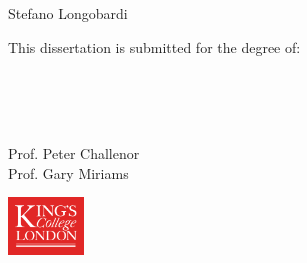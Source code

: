 \begin{titlepage}
    \begin{center}
        \large
        
        \vfill
        
        \hfill
        
        \begingroup
            \color{CTtitle}\spacedallcaps{\myTitle} \\ \bigskip
        \endgroup
        
        \vfill
        
         \\ \medskip
        Stefano Longobardi
        
        \vfill
        
        This dissertation is submitted for the degree of: \\ \medskip
        \textit{\myDegree}
        
        \vfill
        
        \begin{minipage}[t]{0.1\textwidth}
        \end{minipage}
        \hfill
        \begin{minipage}[t]{0.4\textwidth}\raggedright
         \\ \medskip
        \myProf \\
        \myOtherProf
        \end{minipage}
        \hfill
        \begin{minipage}[t]{0.4\textwidth}\raggedleft
         \\ \medskip
        Prof. Peter Challenor \\
        Prof. Gary Miriams
        \end{minipage}
        \hfill
        \begin{minipage}[t]{0.1\textwidth}
        \end{minipage}
        
        \vfill
        
        \includegraphics[width=2cm]{figures/titlepage/Kings_College_London_logo.pdf} \\ \medskip
        

\end{center}
\end{titlepage}
